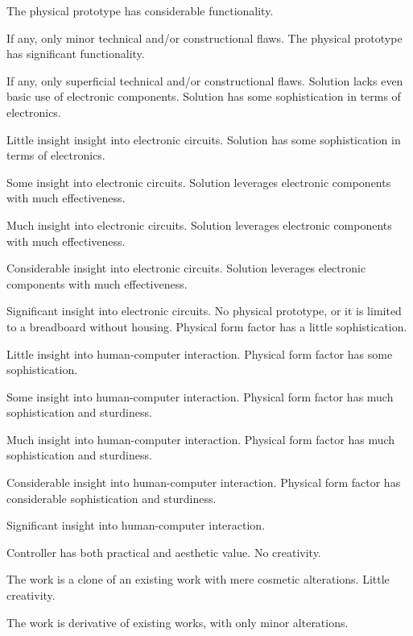 \documentclass{../../fal_assignment}
\begin{document}
\begin{markingrubric}
	\grade The physical prototype has considerable functionality.
	\par If any, only minor technical and/or constructional flaws.
	\grade The physical prototype has significant functionality.
	\par If any, only superficial technical and/or constructional flaws.
	\grade\fail Solution lacks even basic use of electronic components.
	\grade Solution has some sophistication in terms of electronics.
	\par Little insight insight into electronic circuits.
	\grade Solution has some sophistication  in terms of electronics.
	\par Some insight into electronic circuits.
	\grade Solution leverages electronic components with much effectiveness.
	\par Much insight into electronic circuits.
	\grade Solution leverages electronic components with much effectiveness.
	\par Considerable insight into electronic circuits.
	\grade Solution leverages electronic components with much effectiveness.
	\par Significant insight into electronic circuits.
	\grade\fail No physical prototype, or it is limited to a breadboard without housing.
	\grade Physical form factor has a little sophistication.
	\par Little insight into human-computer interaction.
	\grade Physical form factor has some sophistication.
	\par Some insight into human-computer interaction.
	\grade Physical form factor has much sophistication and sturdiness.
	\par Much insight into human-computer interaction.
	\grade Physical form factor has much sophistication  and sturdiness.
	\par Considerable insight into human-computer interaction.
	\grade Physical form factor has considerable sophistication and sturdiness.
	\par Significant insight into human-computer interaction.
	\par Controller has both practical and aesthetic value.
	\grade\fail No creativity.
	\par The work is a clone of an existing work with mere cosmetic alterations.
	\grade Little creativity.
	\par The work is derivative of existing works, with only minor alterations.

\end{markingrubric}
\end{document}
